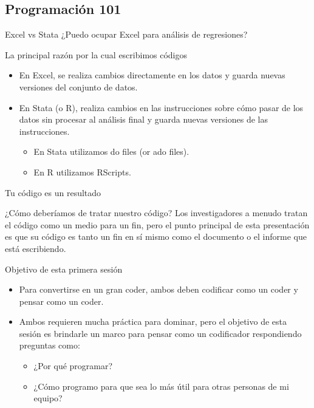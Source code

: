 \documentclass[11pt, aspectratio=169, compress]{beamer}
\begin{document}
\subsection{Programación 101}
\begin{frame}{Excel vs Stata}
	¿Puedo ocupar Excel para análisis de regresiones?
\end{frame}
\begin{frame}{La principal razón por la cual escribimos códigos}
	\begin{itemize}
		\item En Excel, se realiza cambios directamente en los datos y guarda nuevas versiones del conjunto de datos. 
		\item En Stata (o R), realiza cambios en las instrucciones sobre cómo pasar de los datos sin procesar al análisis final y guarda nuevas versiones de las instrucciones.
		\begin{itemize}
			\item En Stata utilizamos do files (or ado files).
			\item En R utilizamos RScripts.
		\end{itemize}
	\end{itemize}
\end{frame}
\begin{frame}{Tu código es un resultado}
	\begin{block}{¿Cómo deberíamos de tratar nuestro código?}
		Los investigadores a menudo tratan el código como un medio para un fin, pero el punto principal de esta presentación es que su código es tanto un fin en sí mismo como el documento o el informe que está escribiendo.
	\end{block}
\end{frame}
\begin{frame}{Objetivo de esta primera sesión}
	\begin{itemize}
		\item Para convertirse en un gran coder, ambos deben codificar como un coder y pensar como un coder.

		\item Ambos requieren mucha práctica para dominar, pero el objetivo de esta sesión es brindarle un marco para pensar como un codificador respondiendo preguntas como:
		
		\begin{itemize}
			\item ¿Por qué programar?
		
			\item ¿Cómo programo para que sea lo más útil para otras personas de mi equipo?
		\end{itemize}	
	\end{itemize}

\end{frame}
\end{document}
